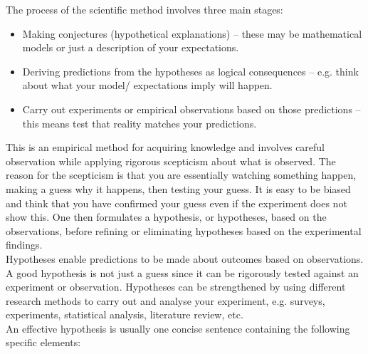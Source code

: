 The process of the scientific method involves three main stages:
\begin{itemize}
\setlength{\itemsep}{-5pt}
    \item Making conjectures (hypothetical explanations) -- these may be mathematical models or just a description of your expectations.
    \item Deriving predictions from the hypotheses as logical consequences -- e.g. think about what your model/ expectations imply will happen.
    \item Carry out experiments or empirical observations based on those predictions -- this means test that reality matches your predictions.
\end{itemize}

This is an empirical method for acquiring knowledge and involves careful observation while applying rigorous scepticism about what is observed. The reason for the scepticism is that you are essentially watching something happen, making a guess why it happens, then testing your guess. It is easy to be biased and think that you have confirmed your guess even if the experiment does not show this. One then formulates a hypothesis, or hypotheses, based on the observations, before refining or eliminating hypotheses based on the experimental findings.\\

Hypotheses enable predictions to be made about outcomes based on observations. A good hypothesis is not just a guess since it can be rigorously tested against an experiment or observation. Hypotheses can be strengthened by using different research methods to carry out and analyse your experiment, e.g. surveys, experiments, statistical analysis, literature review, etc.\\

An effective hypothesis is usually one concise sentence containing the following specific elements:


